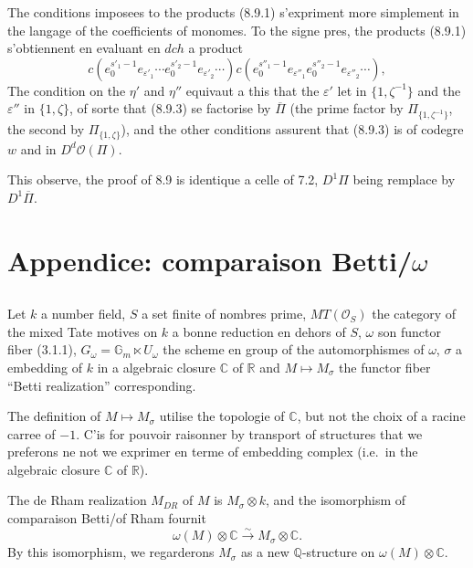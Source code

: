 \documentclass[11pt,a4paper]{article}
\theoremstyle{plain}
\theoremstyle{definition}
\newcommand{\dch}{\mathit{dch}}
\newcommand{\Gm}{\mathbb{G}_m}
\newcommand{\Q}{\mathbb{Q}}
\newcommand{\C}{\mathbb{C}}
\newcommand{\R}{\mathbb{R}}
\begin{document}
The conditions imposees to the products (8.9.1) s'expriment more simplement in the langage of the coefficients of monomes. To the signe pres, the products (8.9.1) s'obtiennent en evaluant en $\dch$ a product
\begin{equation}\label{eq:8.9.3}
c(e_0^{s'_1-1}e_{\varepsilon'_1} \cdots e_0^{s'_2-1}e_{\varepsilon'_2} \cdots)c(e_0^{s''_1-1}e_{\varepsilon''_1} e_0^{s''_2-1}e_{\varepsilon''_2} \cdots),
\end{equation}
The condition on the $\eta'$ and $\eta''$ equivaut a this that the $\varepsilon'$ let in $\{1, \zeta^{-1}\}$ and the $\varepsilon''$ in $\{1, \zeta\}$, of sorte that (8.9.3) se factorise by $\overline{\Pi}$ (the prime factor by $\Pi_{\{1,\zeta^{-1}\}}$, the second by $\Pi_{\{1,\zeta\}}$), and the other conditions assurent that (8.9.3) is of codegre $w$ and in $D^d \mathcal{O}(\Pi)$.

This observe, the proof of 8.9 is identique a celle of 7.2, $D^1\Pi$ being remplace by $D^1\overline{\Pi}$.

\section*{Appendice: comparaison Betti/$\omega$}
\label{sec:A}

\subsection{}
Let $k$ a number field, $S$ a set finite of nombres prime, $MT(\mathcal{O}_S)$ the category of the mixed Tate motives on $k$ a bonne reduction en dehors of $S$, $\omega$ son functor fiber (3.1.1), $G_\omega = \Gm \ltimes U_\omega$ the scheme en group of the automorphismes of $\omega$, $\sigma$ a embedding of $k$ in a algebraic closure $\C$ of $\R$ and $M \mapsto M_\sigma$ the functor fiber ``Betti realization'' corresponding.

The definition of $M \mapsto M_\sigma$ utilise the topologie of $\C$, but not the choix of a racine carree of $-1$. C'is for pouvoir raisonner by transport of structures that we preferons ne not we exprimer en terme of embedding complex (i.e.~in the algebraic closure $\C$ of $\R$).

The de Rham realization $M_{DR}$ of $M$ is $M_\sigma \otimes k$, and the isomorphism of comparaison Betti/of Rham fournit
\begin{equation}\label{eq:A.1.1}
\omega(M) \otimes \C \xrightarrow{\sim} M_\sigma \otimes \C.
\end{equation}
By this isomorphism, we regarderons $M_\sigma$ as a new $\Q$-structure on $\omega(M) \otimes \C$.
\end{document}

